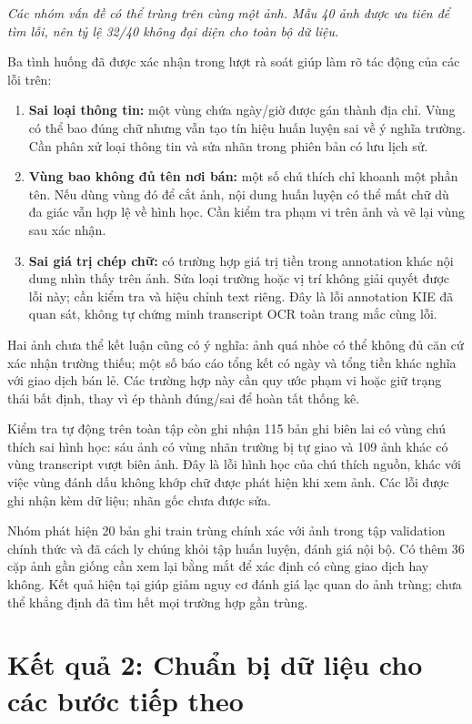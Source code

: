 \documentclass[11pt,a4paper]{article}
\begin{document}
\noindent\textit{Các nhóm vấn đề có thể trùng trên cùng một ảnh. Mẫu 40 ảnh được ưu tiên để tìm lỗi, nên tỷ lệ 32/40 không đại diện cho toàn bộ dữ liệu.}

Ba tình huống đã được xác nhận trong lượt rà soát giúp làm rõ tác động của các lỗi trên:
\begin{enumerate}[leftmargin=1.6em,itemsep=5pt]
\item \textbf{Sai loại thông tin:} một vùng chứa ngày/giờ được gán thành địa chỉ. Vùng có thể bao đúng chữ nhưng vẫn tạo tín hiệu huấn luyện sai về ý nghĩa trường. Cần phân xử loại thông tin và sửa nhãn trong phiên bản có lưu lịch sử.
\item \textbf{Vùng bao không đủ tên nơi bán:} một số chú thích chỉ khoanh một phần tên. Nếu dùng vùng đó để cắt ảnh, nội dung huấn luyện có thể mất chữ dù đa giác vẫn hợp lệ về hình học. Cần kiểm tra phạm vi trên ảnh và vẽ lại vùng sau xác nhận.
\item \textbf{Sai giá trị chép chữ:} có trường hợp giá trị tiền trong annotation khác nội dung nhìn thấy trên ảnh. Sửa loại trường hoặc vị trí không giải quyết được lỗi này; cần kiểm tra và hiệu chỉnh text riêng. Đây là lỗi annotation KIE đã quan sát, không tự chứng minh transcript OCR toàn trang mắc cùng lỗi.
\end{enumerate}

Hai ảnh chưa thể kết luận cũng có ý nghĩa: ảnh quá nhòe có thể không đủ căn cứ xác nhận trường thiếu; một số báo cáo tổng kết có ngày và tổng tiền khác nghĩa với giao dịch bán lẻ. Các trường hợp này cần quy ước phạm vi hoặc giữ trạng thái bất định, thay vì ép thành đúng/sai để hoàn tất thống kê.

Kiểm tra tự động trên toàn tập còn ghi nhận 115 bản ghi biên lai có vùng chú thích sai hình học: sáu ảnh có vùng nhãn trường bị tự giao và 109 ảnh khác có vùng transcript vượt biên ảnh. Đây là lỗi hình học của chú thích nguồn, khác với việc vùng đánh dấu không khớp chữ được phát hiện khi xem ảnh. Các lỗi được ghi nhận kèm dữ liệu; nhãn gốc chưa được sửa.

Nhóm phát hiện 20 bản ghi train trùng chính xác với ảnh trong tập validation chính thức và đã cách ly chúng khỏi tập huấn luyện, đánh giá nội bộ. Có thêm 36 cặp ảnh gần giống cần xem lại bằng mắt để xác định có cùng giao dịch hay không. Kết quả hiện tại giúp giảm nguy cơ đánh giá lạc quan do ảnh trùng; chưa thể khẳng định đã tìm hết mọi trường hợp gần trùng.

\section{Kết quả 2: Chuẩn bị dữ liệu cho các bước tiếp theo}
\end{document}
